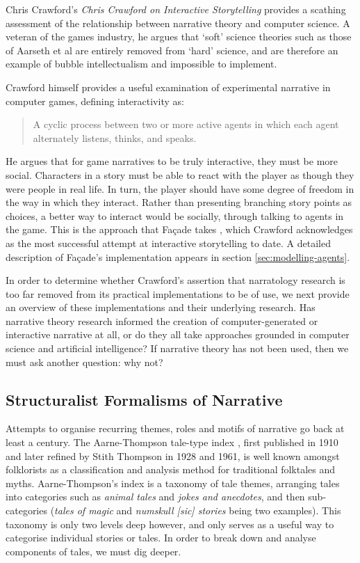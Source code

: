 Chris Crawford's \emph{Chris Crawford on Interactive Storytelling} \citep{crawford2012chris} provides a scathing assessment of the relationship between narrative theory and computer science. A veteran of the games industry, he argues that `soft' science theories such as those of Aarseth et al are entirely removed from `hard' science, and are therefore an example of bubble intellectualism and impossible to implement. 

Crawford himself provides a useful examination of experimental narrative in computer games, defining interactivity as:

\begin{quote}
A cyclic process between two or more active agents in which each agent alternately listens, thinks, and speaks.
\end{quote}

He argues that for game narratives to be truly interactive, they must be more social. Characters in a story must be able to react with the player as though they were people in real life. In turn, the player should have some degree of freedom in the way in which they interact. Rather than presenting branching story points as choices, a better way to interact would be socially, through talking to agents in the game. This is the approach that Fa\c{c}ade takes \citep{mateas2003faccade}, which Crawford acknowledges as the most successful attempt at interactive storytelling to date. A detailed description of Fa\c{c}ade's implementation appears in section \ref{sec:modelling-agents}.

In order to determine whether Crawford's assertion that narratology research is too far removed from its practical implementations to be of use, we next provide an overview of these implementations and their underlying research. Has narrative theory research informed the creation of computer-generated or interactive narrative at all, or do they all take approaches grounded in computer science and artificial intelligence? If narrative theory has not been used, then we must ask another question: why not?


\subsection{Structuralist Formalisms of Narrative}
Attempts to organise recurring themes, roles and motifs of narrative go back at least a century. The Aarne-Thompson tale-type index \citep{aarne1987types}, first published in 1910 and later refined by Stith Thompson in 1928 and 1961, is well known amongst folklorists as a classification and analysis method for traditional folktales and myths. Aarne-Thompson's index is a taxonomy of tale themes, arranging tales into categories such as \emph{animal tales} and \emph{jokes and anecdotes}, and then sub-categories (\emph{tales of magic} and \emph{numskull [sic] stories} being two examples). This taxonomy is only two levels deep however, and only serves as a useful way to categorise individual stories or tales. In order to break down and analyse components of tales, we must dig deeper.

